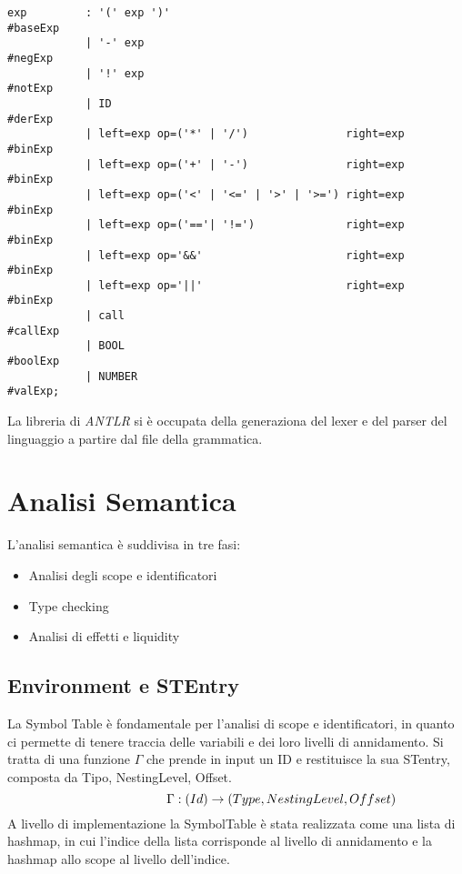 \documentclass[12pt,twoside,openright,a4paper]{report}
\begin{document}
\begin{lstlisting}
exp	        : '(' exp ')'				                        #baseExp
            | '-' exp					                        #negExp
            | '!' exp                                           #notExp
            | ID						                        #derExp
            | left=exp op=('*' | '/')               right=exp   #binExp
            | left=exp op=('+' | '-')               right=exp   #binExp
            | left=exp op=('<' | '<=' | '>' | '>=') right=exp   #binExp
            | left=exp op=('=='| '!=')              right=exp   #binExp
            | left=exp op='&&'                      right=exp   #binExp
            | left=exp op='||'                      right=exp   #binExp
            | call                                              #callExp
            | BOOL                                              #boolExp
            | NUMBER					                        #valExp;
\end{lstlisting}
La libreria di \textit{ANTLR} si è occupata della generaziona del lexer e del parser del linguaggio a partire dal file della grammatica.

\chapter{Analisi Semantica}
L'analisi semantica è suddivisa in tre fasi: 
\begin{itemize}
    \item Analisi degli scope e identificatori
    \item Type checking
    \item Analisi di effetti e liquidity
\end{itemize}
   
\section{Environment e STEntry}
La Symbol Table è fondamentale per l'analisi di scope e identificatori, in quanto ci permette di tenere traccia delle variabili e dei loro livelli di annidamento. Si tratta di una funzione \(\Gamma\) che prende in input un ID e restituisce la sua STentry, composta da Tipo, NestingLevel, Offset.
\begin{equation}
    \hspace{2.5cm} \Gamma : (Id) \rightarrow (Type, NestingLevel, Offset)
\end{equation}
A livello di implementazione la SymbolTable è stata realizzata come una lista di hashmap, in cui l'indice della lista corrisponde al livello di annidamento e la hashmap allo scope al livello dell'indice.
\end{document}
